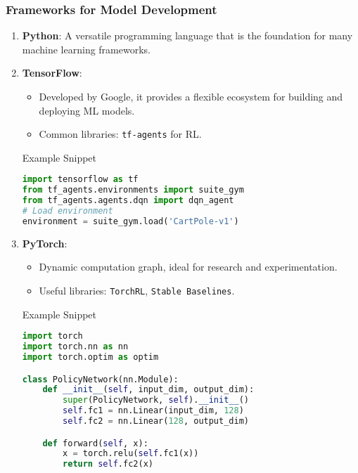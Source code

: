 \documentclass[aspectratio=169]{beamer}
\begin{document}
\begin{frame}[fragile]
    \frametitle{Frameworks for Model Development}
    \begin{enumerate}
        \item \textbf{Python}: A versatile programming language that is the foundation for many machine learning frameworks.
        \item \textbf{TensorFlow}:
        \begin{itemize}
            \item Developed by Google, it provides a flexible ecosystem for building and deploying ML models.
            \item Common libraries: \texttt{tf-agents} for RL.
        \end{itemize}
        \begin{block}{Example Snippet}
        \begin{lstlisting}[language=Python]
import tensorflow as tf
from tf_agents.environments import suite_gym
from tf_agents.agents.dqn import dqn_agent
# Load environment
environment = suite_gym.load('CartPole-v1')
        \end{lstlisting}
        \end{block}
        \item \textbf{PyTorch}:
        \begin{itemize}
            \item Dynamic computation graph, ideal for research and experimentation.
            \item Useful libraries: \texttt{TorchRL}, \texttt{Stable Baselines}.
        \end{itemize}
        \begin{block}{Example Snippet}
        \begin{lstlisting}[language=Python]
import torch
import torch.nn as nn
import torch.optim as optim

class PolicyNetwork(nn.Module):
    def __init__(self, input_dim, output_dim):
        super(PolicyNetwork, self).__init__()
        self.fc1 = nn.Linear(input_dim, 128)
        self.fc2 = nn.Linear(128, output_dim)

    def forward(self, x):
        x = torch.relu(self.fc1(x))
        return self.fc2(x)
        \end{lstlisting}
        \end{block}
    \end{enumerate}
\end{frame}
\end{document}
